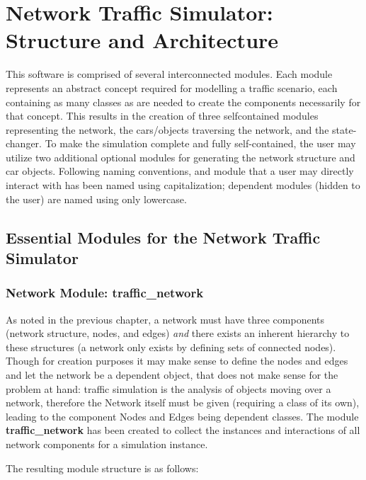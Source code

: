 \chapter{Network Traffic Simulator:  Structure and Architecture}
\label{Structure}

\par This software is comprised of several interconnected modules.  Each module represents an abstract concept required for modelling a traffic scenario, each containing as many classes as are needed to create the components necessarily for that concept.  This results in the creation of three self\-contained modules representing the network, the cars/objects traversing the network, and the state-changer.  To make the simulation complete and fully self-contained, the user may utilize two additional optional modules for generating the network structure and car objects. Following naming conventions, and module that a user may directly interact with has been named using capitalization; dependent modules (hidden to the user) are named using only lowercase.

\section{Essential Modules for the Network Traffic \\ Simulator}

\subsection{Network Module:  traffic\_network}

\par As noted in the previous chapter, a network must have three components (network structure, nodes, and edges) \textit{and} there exists an inherent hierarchy to these structures (a network only exists by defining sets of connected nodes).  Though for creation purposes it may make sense to define the nodes and edges and let the network be a dependent object, that does not make sense for the problem at hand:  traffic simulation is the analysis of objects moving over a network, therefore the Network itself must be given (requiring a class of its own), leading to the component Nodes and Edges being dependent classes.  The module \textbf{traffic\_network} has been created to collect the instances and interactions of all network components for a simulation instance.  \\

\par The resulting module structure is as follows:

